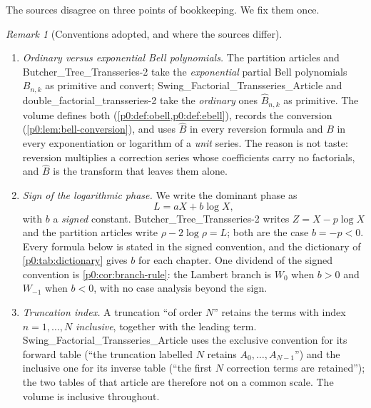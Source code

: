\documentclass[11pt,a4paper,oneside]{book}
\theoremstyle{plain}
\theoremstyle{definition}
\theoremstyle{remark}
\newtheorem{remark}[theorem]{Remark}
\newcommand{\OB}{\widehat{B}}
\newcommand{\EB}{B}
\newcommand{\Wlam}{W}
\begin{document}
The sources disagree on three points of bookkeeping.  We fix them once.

\begin{remark}[Conventions adopted, and where the sources differ]
\label{p0:rem:conventions}
\leavevmode
\begin{enumerate}
\item \emph{Ordinary versus exponential Bell polynomials.}  The partition
      articles and \textsf{Butcher\_Tree\_Transseries-2} take the
      \emph{exponential} partial Bell polynomials $\EB_{n,k}$ as primitive and
      convert; \textsf{Swing\_Factorial\_Transseries\_Article} and
      \textsf{double\_factorial\_transseries-2} take the \emph{ordinary} ones
      $\OB_{n,k}$ as primitive.  The volume defines both
      (\cref{p0:def:obell,p0:def:ebell}), records the conversion
      (\cref{p0:lem:bell-conversion}), and uses $\OB$ in every reversion
      formula and $\EB$ in every exponentiation or logarithm of a
      \emph{unit} series.  The reason is not taste: reversion multiplies a
      correction series whose coefficients carry no factorials, and $\OB$ is
      the transform that leaves them alone.
\item \emph{Sign of the logarithmic phase.}  We write the dominant phase as
      \[
        L=aX+b\log X ,
      \]
      with $b$ a \emph{signed} constant.  \textsf{Butcher\_Tree\_Transseries-2}
      writes $Z=X-p\log X$ and the partition articles write $\rho-2\log\rho=L$;
      both are the case $b=-p<0$.  Every formula below is stated in the signed
      convention, and the dictionary of
      \cref{p0:tab:dictionary} gives $b$ for each chapter.  One dividend of the
      signed convention is \cref{p0:cor:branch-rule}: the Lambert branch is
      $\Wlam_0$ when $b>0$ and $\Wlam_{-1}$ when $b<0$, with no case analysis
      beyond the sign.
\item \emph{Truncation index.}  A truncation ``of order $N$'' retains the terms
      with index $n=1,\dots,N$ \emph{inclusive}, together with the leading
      term.  \textsf{Swing\_Factorial\_Transseries\_Article} uses the exclusive
      convention for its forward table (``the truncation labelled $N$ retains
      $A_0,\dots,A_{N-1}$'') and the inclusive one for its inverse table
      (``the first $N$ correction terms are retained''); the two tables of that
      article are therefore not on a common scale.  The volume is inclusive
      throughout.
\end{enumerate}
\end{remark}
\end{document}
